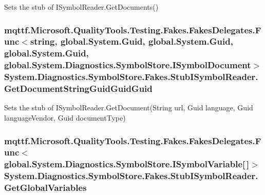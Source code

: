 Sets the stub of I\-Symbol\-Reader.\-Get\-Documents()

\hypertarget{class_system_1_1_diagnostics_1_1_symbol_store_1_1_fakes_1_1_stub_i_symbol_reader_ae46eba3c8c11076bce6ad7cbd35e779f}{
\subsubsection[{Get\-Document\-String\-Guid\-Guid\-Guid}]{\setlength{\rightskip}{0pt plus 5cm}mqttf.\-Microsoft.\-Quality\-Tools.\-Testing.\-Fakes.\-Fakes\-Delegates.\-Func$<$string, global.\-System.\-Guid, global.\-System.\-Guid, global.\-System.\-Guid, global.\-System.\-Diagnostics.\-Symbol\-Store.\-I\-Symbol\-Document$>$ System.\-Diagnostics.\-Symbol\-Store.\-Fakes.\-Stub\-I\-Symbol\-Reader.\-Get\-Document\-String\-Guid\-Guid\-Guid}}\label{class_system_1_1_diagnostics_1_1_symbol_store_1_1_fakes_1_1_stub_i_symbol_reader_ae46eba3c8c11076bce6ad7cbd35e779f}


Sets the stub of I\-Symbol\-Reader.\-Get\-Document(\-String url, Guid language, Guid language\-Vendor, Guid document\-Type)

\hypertarget{class_system_1_1_diagnostics_1_1_symbol_store_1_1_fakes_1_1_stub_i_symbol_reader_a2cc7f47e7d60227b6fd28b90952b2587}{
\subsubsection[{Get\-Global\-Variables}]{\setlength{\rightskip}{0pt plus 5cm}mqttf.\-Microsoft.\-Quality\-Tools.\-Testing.\-Fakes.\-Fakes\-Delegates.\-Func$<$global.\-System.\-Diagnostics.\-Symbol\-Store.\-I\-Symbol\-Variable\mbox{[}$\,$\mbox{]}$>$ System.\-Diagnostics.\-Symbol\-Store.\-Fakes.\-Stub\-I\-Symbol\-Reader.\-Get\-Global\-Variables}}\label{class_system_1_1_diagnostics_1_1_symbol_store_1_1_fakes_1_1_stub_i_symbol_reader_a2cc7f47e7d60227b6fd28b90952b2587}


